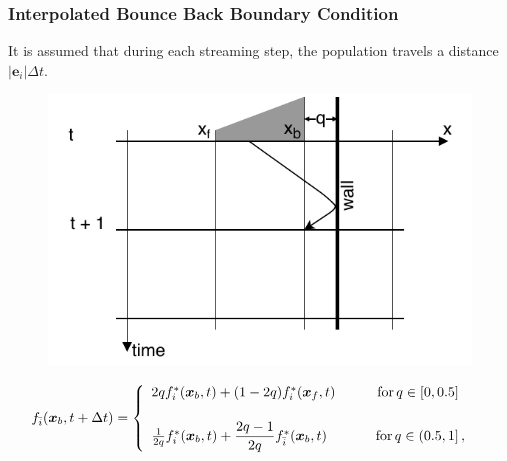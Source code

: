 \documentclass[10pt]{beamer}
\begin{document}
\begin{frame}\frametitle{Interpolated Bounce Back Boundary Condition}
It is assumed that during each streaming step, the population travels a distance $|\boldsymbol{e}_i| \Delta t$. 
\begin{figure}[H]
\begin{center}
   \includegraphics[width=0.6 \textwidth]{obrazki/IBB.pdf}  
 \end{center}
\end{figure}
\pause
\begin{align*}  
f_{\bar{i}}(\boldsymbol{x}_b,t + \Delta t)  &=
\left\{ 
	\begin{array}{ll}
				2q f_i^{*}(\boldsymbol{x}_b,t) + (1-2q)f_i^{*}(\boldsymbol{x}_f,t)
			  \hspace{3.0em} \text{for} \, q \in \left[0, 0.5 \right]  \vspace{1.5em} \\
				\frac{1}{2q} f_i^{*}(\boldsymbol{x}_b,t) + \dfrac{2q-1}{2q} f_{\bar{i}}^{*}(\boldsymbol{x}_b,t)
			 \hspace{3.5em} \text{for} \,q \in \left( 0.5, 1 \right],
	\end{array} 
\right. \label{eq:IBB}
\end{align*}  
\end{frame}
\end{document}

